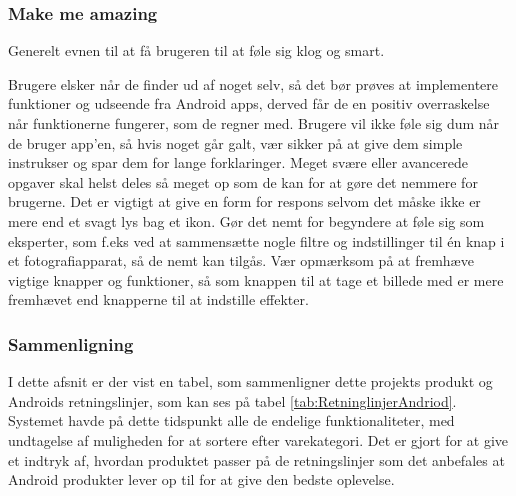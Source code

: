 \subsubsection*{Make me amazing}
Generelt evnen til at få brugeren til at føle sig klog og smart.

Brugere elsker når de finder ud af noget selv, så det bør prøves at implementere funktioner og udseende fra Android apps, derved får de en positiv overraskelse når funktionerne fungerer, som de regner med. Brugere vil ikke føle sig dum når de bruger app'en, så hvis noget går galt, vær sikker på at give dem simple instrukser og spar dem for lange forklaringer. Meget svære eller avancerede opgaver skal helst deles så meget op som de kan for at gøre det nemmere for brugerne. Det er vigtigt at give en form for respons selvom det måske ikke er mere end et svagt lys bag et ikon. Gør det nemt for begyndere at føle sig som eksperter, som f.eks ved at sammensætte nogle filtre og indstillinger til én knap i et fotografiapparat, så de nemt kan tilgås. Vær opmærksom på at fremhæve vigtige knapper og funktioner, så som knappen til at tage et billede med er mere fremhævet end knapperne til at indstille effekter.

\subsubsection{Sammenligning}
I dette afsnit er der vist en tabel, som sammenligner dette projekts produkt og Androids retningslinjer, som kan ses på tabel \ref{tab:RetninglinjerAndriod}. Systemet havde på dette tidspunkt alle de endelige funktionaliteter, med undtagelse af muligheden for at sortere efter varekategori. Det er gjort for at give et indtryk af, hvordan produktet passer på de retningslinjer som det anbefales at Android produkter lever op til for at give den bedste oplevelse. 

